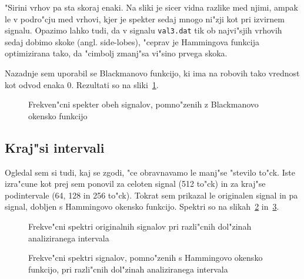 \documentclass[a4paper,10pt]{article}
\begin{document}
"Sirini vrhov pa sta skoraj enaki. Na sliki je sicer vidna razlike med njimi, ampak le v podro"cju med vrhovi, kjer je spekter sedaj mnogo ni"zji kot pri izvirnem signalu. Opazimo lahko tudi, da v signalu \texttt{val3.dat} tik ob najvi"sjih vrhovih sedaj dobimo skoke (angl. side-lobes), "ceprav je Hammingova funkcija optimizirana tako, da "cimbolj zmanj"sa vi"sino prvega skoka. 

Nazadnje sem uporabil se Blackmanovo funkcijo, ki ima na robovih tako vrednost kot odvod enaka 0. Rezultati so na sliki~\ref{fig:val-black}. 

\begin{figure}[h]
 
\caption{Frekven"cni spekter obeh signalov, pomno"zenih z Blackmanovo okensko funkcijo}
\label{fig:val-black}
\end{figure}

\cleardoublepage
\subsection{Kraj"si intervali}

Ogledal sem si tudi, kaj se zgodi, "ce obravnavamo le manj"se "stevilo to"ck. Iste izra"cune kot prej sem ponovil za celoten signal (512 to"ck) in za kraj"se podintervale (64, 128 in 256 to"ck). Tokrat sem prikazal le originalen signal in pa signal, dobljen s Hammingovo okensko funkcijo. Spektri so na slikah~\ref{fig:val-dolzina} in~\ref{fig:val-dolzina-hamm}. 

\begin{figure}[h]
 \subfigure[$M = 64$]{} 
 \subfigure[$M = 128$]{}
 \subfigure[$M = 256$]{}
 \subfigure[$M = 512$]{}
\caption{Frekve"cni spektri originalnih signalov pri razli"cnih dol"zinah analiziranega intervala}
\label{fig:val-dolzina}
\end{figure}

\begin{figure}[h]
 \subfigure[$M = 64$]{} 
 \subfigure[$M = 128$]{}
 \subfigure[$M = 256$]{}
 \subfigure[$M = 512$]{}
\caption{Frekve"cni spektri signalov, pomno"zenih s Hammingovo okensko funkcijo, pri razli"cnih dol"zinah analiziranega intervala}
\label{fig:val-dolzina-hamm}
\end{figure}
\end{document}
